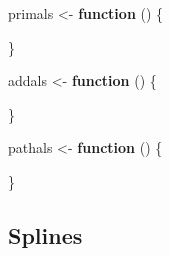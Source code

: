 \documentclass[
  12pt,
]{book}
\newenvironment{Shaded}{\begin{snugshade}}{\end{snugshade}}
\newcommand{\ControlFlowTok}[1]{\textcolor[rgb]{0.13,0.29,0.53}{\textbf{#1}}}
\newcommand{\NormalTok}[1]{#1}
\newcommand{\OtherTok}[1]{\textcolor[rgb]{0.56,0.35,0.01}{#1}}
\begin{document}
\begin{Shaded}
\begin{Highlighting}[]
\NormalTok{primals }\OtherTok{\textless{}{-}} \ControlFlowTok{function}\NormalTok{ () \{}

\NormalTok{\}}

\NormalTok{addals }\OtherTok{\textless{}{-}} \ControlFlowTok{function}\NormalTok{ () \{}

\NormalTok{\}}

\NormalTok{pathals }\OtherTok{\textless{}{-}} \ControlFlowTok{function}\NormalTok{ () \{}

\NormalTok{\}}
\end{Highlighting}
\end{Shaded}

\hypertarget{splines}{%
\subsection{Splines}\label{splines}}
\end{document}
